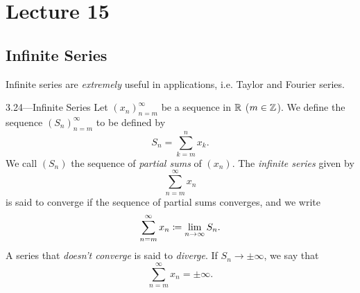 \documentclass[class=article, crop=false]{standalone}
\begin{document}
  \section{Lecture 15}
  \subsection{Infinite Series}
  Infinite series are \emph{extremely} useful in applications, i.e. Taylor and Fourier series.
  \begin{definition}{3.24---Infinite Series}
    Let $(x_n)_{n = m}^{\infty}$ be a sequence in $\mathbb{R}$ ($m\in\mathbb{Z}$). We define the sequence $(S_n)_{n = m}^{\infty}$ to be defined by
    \[
      S_n = \sum_{k=m}^{n}x_k.
    \]
    We call $(S_n)$ the sequence of \emph{partial sums} of $(x_n)$. The \emph{infinite series} given by
    \[
      \sum_{n=m}^{\infty}x_n
    \]
    is said to converge if the sequence of partial sums converges, and we write
    \[
      \sum_{n=m}^{\infty}x_n \coloneqq \lim_{n\to \infty} S_n.
    \]
    A series that \emph{doesn't converge} is said to \emph{diverge}. If $S_n\to\pm\infty$, we say that
    \[
      \sum_{n=m}^{\infty}x_n = \pm\infty.
    \]
  \end{definition}
\end{document}
